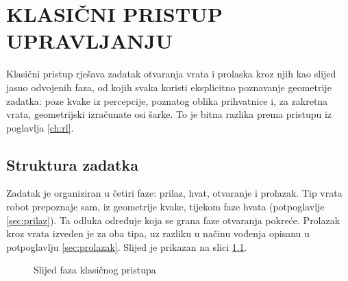\chapter{KLASIČNI PRISTUP UPRAVLJANJU}
\label{ch:klasicni}

Klasični pristup rješava zadatak otvaranja vrata i prolaska kroz njih kao slijed jasno
odvojenih faza, od kojih svaka koristi eksplicitno poznavanje geometrije zadatka: poze kvake
iz percepcije, poznatog oblika prihvatnice i, za zakretna vrata, geometrijski izračunate osi
šarke. To je bitna razlika prema pristupu iz poglavlja \ref{ch:rl}.

\section{Struktura zadatka}
\label{sec:faze}

Zadatak je organiziran u četiri faze: prilaz, hvat, otvaranje i prolazak. Tip vrata robot prepoznaje
sam, iz geometrije kvake, tijekom faze hvata (potpoglavlje \ref{sec:prilaz}).
Ta odluka određuje koja se grana faze otvaranja pokreće.
Prolazak kroz vrata izveden je za oba tipa, uz razliku u načinu vođenja opisanu u
potpoglavlju \ref{sec:prolazak}. Slijed je prikazan na slici \ref{fig:faze}.

\begin{figure}[H]
      \centering
      \caption{Slijed faza klasičnog pristupa}
      \label{fig:faze}
\end{figure}

